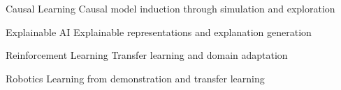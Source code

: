 


\begin{cvskills}


\cvskill
{Causal Learning} %
{Causal model induction through simulation and exploration} %


\cvskill
{Explainable AI} %
{Explainable representations and explanation generation} %


\cvskill
{Reinforcement Learning} %
{Transfer learning and domain adaptation} %


\cvskill
{Robotics} %
{Learning from demonstration and transfer learning} %


\end{cvskills}